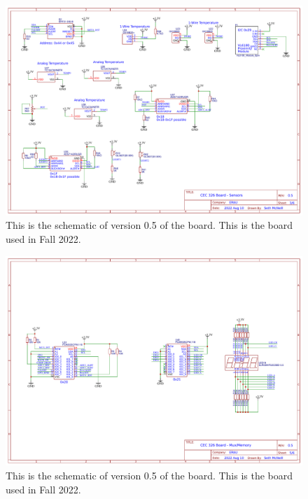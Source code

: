 \begin{landscape}
\begin{figure}[!htb]
	\centering
	\includegraphics[width=\paperwidth]{arduinoStart/Schematic_CEC326v0.5_Sensors} %
	\caption{This is the schematic of version 0.5 of the board. This is the board used in Fall 2022.}
	\label{fig:boardSchematic3}
\end{figure} 

\begin{figure}[!htb]
	\centering
	\includegraphics[width=\paperwidth]{arduinoStart/Schematic_CEC326v0.5_Mux} %
	\caption{This is the schematic of version 0.5 of the board. This is the board used in Fall 2022.}
	\label{fig:boardSchematic4}
\end{figure} 


\end{landscape}
